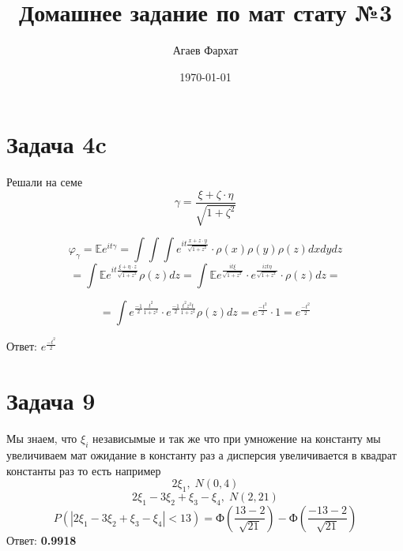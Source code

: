 \documentclass[a4paper, 12pt]{article} %
\author{Агаев Фархат}
\title{Домашнее задание по мат стату №3}
\date{\today}
\begin{document}

\maketitle

\section*{Задача 4c}
Решали на семе
\[\gamma = 
\frac{\xi + \zeta \cdot \eta}{\sqrt{1 + \zeta^2}}\]

\[\varphi_{\gamma} = \mathds{E} e^{it\gamma} 
= \int\int\int e^{it\frac{x + z\cdot y}{\sqrt{1 + z^2}}} \cdot \rho(x) \rho(y) \rho(z) dx dy dz 
\]
 \[= \int \mathds{E} e^{it\frac{\xi + \eta \cdot z}{\sqrt{1 + z^2}}} \rho(z) dz =
  \int \mathds{E} e^{\frac{it\xi}{\sqrt{1 + z^2}}} \cdot e ^ {\frac{izt\eta}{\sqrt{1 + z^2}}}
   \cdot \rho(z) dz
  = \] 

  \[= \int e^{\frac{-1}{2}\frac{t^2}{1 + z^2}}
  \cdot e^{\frac{-1}{2}\frac{t^2z^2t}{1 + z^2}} 
  \rho(z) dz = e^{\frac{-t^2}{2}} \cdot 1 
   = e^{\frac{-t^2}{2}}
   \]


Ответ: $e^{\frac{-t^2}{2}}$

\section*{Задача 9}



Мы знаем, что  $\xi_i$ независымые и так же
что при умножение на константу мы увеличиваем мат ожидание в константу раз
а дисперсия увеличивается в квадрат константы раз
то есть например 
\[2\xi_1, \; N(0, 4)\]
\[2\xi_1 -3 \xi_2 + \xi_3 - \xi_4 , \; N(2, 21)\]
\[P(|2\xi_1 -3 \xi_2 + \xi_3 - \xi_4 | < 13) = \text{Ф}\left(\frac{13-2}{\sqrt{21}}\right) - \text{Ф}\left(\frac{-13-2}{\sqrt{21}}\right)
\]
Ответ:  \textbf{0.9918}
\end{document}

